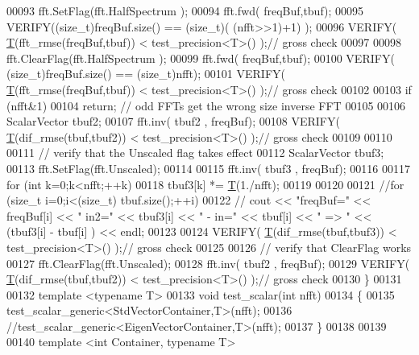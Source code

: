 \begin{DoxyCode}
00093     fft.SetFlag(fft.HalfSpectrum );
00094     fft.fwd( freqBuf,tbuf);
00095     VERIFY((\textcolor{keywordtype}{size\_t})freqBuf.size() == (size\_t)( (nfft>>1)+1) );
00096     VERIFY( \hyperlink{group___sparse_core___module_class_eigen_1_1_triplet}{T}(fft\_rmse(freqBuf,tbuf)) < test\_precision<T>()  );\textcolor{comment}{// gross check}
00097 
00098     fft.ClearFlag(fft.HalfSpectrum );
00099     fft.fwd( freqBuf,tbuf);
00100     VERIFY( (\textcolor{keywordtype}{size\_t})freqBuf.size() == (size\_t)nfft);
00101     VERIFY( \hyperlink{group___sparse_core___module_class_eigen_1_1_triplet}{T}(fft\_rmse(freqBuf,tbuf)) < test\_precision<T>()  );\textcolor{comment}{// gross check}
00102 
00103     \textcolor{keywordflow}{if} (nfft&1)
00104         \textcolor{keywordflow}{return}; \textcolor{comment}{// odd FFTs get the wrong size inverse FFT}
00105 
00106     ScalarVector tbuf2;
00107     fft.inv( tbuf2 , freqBuf);
00108     VERIFY( \hyperlink{group___sparse_core___module_class_eigen_1_1_triplet}{T}(dif\_rmse(tbuf,tbuf2)) < test\_precision<T>()  );\textcolor{comment}{// gross check}
00109 
00110 
00111     \textcolor{comment}{// verify that the Unscaled flag takes effect}
00112     ScalarVector tbuf3;
00113     fft.SetFlag(fft.Unscaled);
00114 
00115     fft.inv( tbuf3 , freqBuf);
00116 
00117     \textcolor{keywordflow}{for} (\textcolor{keywordtype}{int} k=0;k<nfft;++k)
00118         tbuf3[k] *= \hyperlink{group___sparse_core___module_class_eigen_1_1_triplet}{T}(1./nfft);
00119 
00120 
00121     \textcolor{comment}{//for (size\_t i=0;i<(size\_t) tbuf.size();++i)}
00122     \textcolor{comment}{//    cout << "freqBuf=" << freqBuf[i] << " in2=" << tbuf3[i] << " -  in=" << tbuf[i] << " => " <<
       (tbuf3[i] - tbuf[i] ) <<  endl;}
00123 
00124     VERIFY( \hyperlink{group___sparse_core___module_class_eigen_1_1_triplet}{T}(dif\_rmse(tbuf,tbuf3)) < test\_precision<T>()  );\textcolor{comment}{// gross check}
00125 
00126     \textcolor{comment}{// verify that ClearFlag works}
00127     fft.ClearFlag(fft.Unscaled);
00128     fft.inv( tbuf2 , freqBuf);
00129     VERIFY( \hyperlink{group___sparse_core___module_class_eigen_1_1_triplet}{T}(dif\_rmse(tbuf,tbuf2)) < test\_precision<T>()  );\textcolor{comment}{// gross check}
00130 \}
00131 
00132 \textcolor{keyword}{template} <\textcolor{keyword}{typename} T>
00133 \textcolor{keywordtype}{void} test\_scalar(\textcolor{keywordtype}{int} nfft)
00134 \{
00135   test\_scalar\_generic<StdVectorContainer,T>(nfft);
00136   \textcolor{comment}{//test\_scalar\_generic<EigenVectorContainer,T>(nfft);}
00137 \}
00138 
00139 
00140 \textcolor{keyword}{template} <\textcolor{keywordtype}{int} Container, \textcolor{keyword}{typename} T>

\end{DoxyCode}
